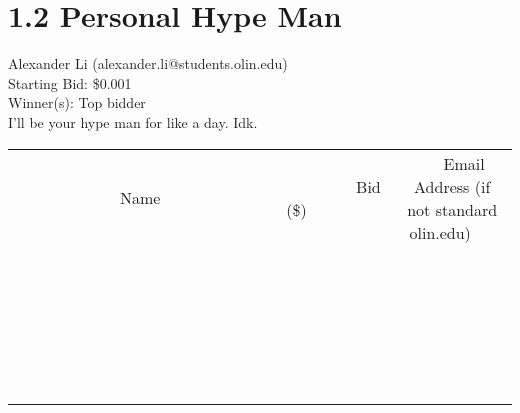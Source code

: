 \documentclass[11pt]{article}
\begin{document}
\section*{1.2 Personal Hype Man}
Alexander Li (alexander.li@students.olin.edu) \\
Starting Bid: \$0.001 \\
Winner(s): 
Top bidder \\
I'll be your hype man for like a day. Idk. \\[6ex]
\begin{tabular}{c c c}
~~~~~~~~~~~~~Name~~~~~~~~~~~~~ & ~~~~~~~~~Bid (\$)~~~~~~~~~ & ~~~Email Address (if not standard olin.edu)~~~ \\
 & & \\
\hline
 & & \\
\hline
 & & \\
\hline
 & & \\
\hline
 & & \\
\hline
 & & \\
\hline
 & & \\
\hline
 & & \\
\hline
 & & \\
\hline
 & & \\
\hline
 & & \\
\hline
 & & \\
\hline
 & & \\
\hline
 & & \\
\hline
 & & \\
\hline
 & & \\
\hline
 & & \\
\hline
 & & \\
\hline
 & & \\
\hline
 & & \\
\hline
 & & \\
\hline
 & & \\
\hline
 & & \\
\hline
 & & \\
\hline
 & & \\
\hline
 & & \\
\hline
\end{tabular}
\clearpage
\end{document}
